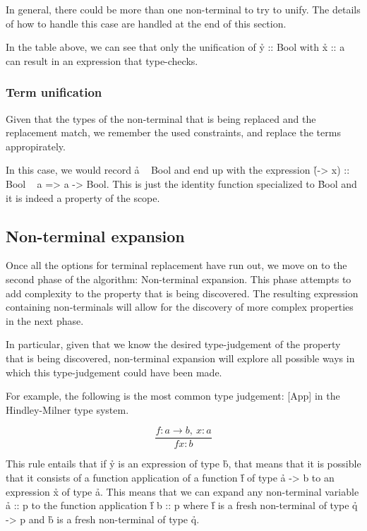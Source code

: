 \documentclass[a4paper, 11pt]{article}
\begin{document}
In general, there could be more than one non-terminal to try to unify.
The details of how to handle this case are handled at the end of this section.

In the table above, we can see that only the unification of \h{y :: Bool} with \h{x :: a} can result in an expression that type-checks.

\subsubsection{Term unification}

Given that the types of the non-terminal that is being replaced and the replacement match, we remember the used constraints, and replace the terms appropirately.

In this case, we would record \h{a ~ Bool} and end up with the expression \h{(\x -> x) :: Bool ~ a => a -> Bool}.
This is just the identity function specialized to \h{Bool} and it is indeed a property of the scope.

\subsection{Non-terminal expansion}

Once all the options for terminal replacement have run out, we move on to the second phase of the algorithm: Non-terminal expansion.
This phase attempts to add complexity to the property that is being discovered.
The resulting expression containing non-terminals will allow for the discovery of more complex properties in the next phase.

In particular, given that we know the desired type-judgement of the property that is being discovered,
non-terminal expansion will explore all possible ways in which this type-judgement could have been made.

For example, the following is the most common type judgement:
[App] in the Hindley-Milner type system. 

\[
  \frac{f : a \rightarrow b,\ x : a}{f x : b}
\]

This rule entails that if \h{y} is an expression of type \h{b}, that means that it is possible that it consists of a function application of a function \h{f} of type \h{a -> b} to an expression \h{x} of type \h{a}.
This means that we can expand any non-terminal variable \h{a :: p} to the function application \h{f b :: p} where \h{f} is a fresh non-terminal of type \h{q -> p} and \h{b} is a fresh non-terminal of type \h{q}.
\end{document}

